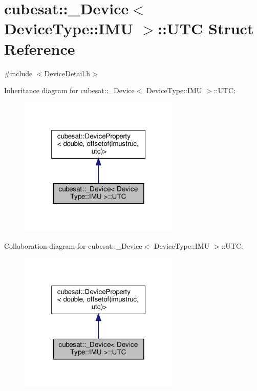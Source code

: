 \hypertarget{structcubesat_1_1__Device_3_01DeviceType_1_1IMU_01_4_1_1UTC}{}\section{cubesat\+:\+:\+\_\+\+Device$<$ Device\+Type\+:\+:I\+MU $>$\+:\+:U\+TC Struct Reference}
\label{structcubesat_1_1__Device_3_01DeviceType_1_1IMU_01_4_1_1UTC}


{\ttfamily \#include $<$Device\+Detail.\+h$>$}



Inheritance diagram for cubesat\+:\+:\+\_\+\+Device$<$ Device\+Type\+:\+:I\+MU $>$\+:\+:U\+TC\+:\nopagebreak
\begin{figure}[H]
\begin{center}
\leavevmode
\includegraphics[width=217pt]{structcubesat_1_1__Device_3_01DeviceType_1_1IMU_01_4_1_1UTC__inherit__graph}
\end{center}
\end{figure}


Collaboration diagram for cubesat\+:\+:\+\_\+\+Device$<$ Device\+Type\+:\+:I\+MU $>$\+:\+:U\+TC\+:\nopagebreak
\begin{figure}[H]
\begin{center}
\leavevmode
\includegraphics[width=217pt]{structcubesat_1_1__Device_3_01DeviceType_1_1IMU_01_4_1_1UTC__coll__graph}
\end{center}
\end{figure}

